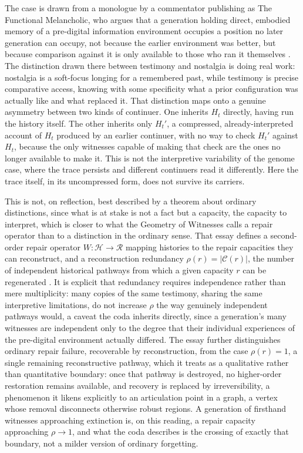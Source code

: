\documentclass[11pt]{article}
\begin{document}
The case is drawn from a monologue by a commentator publishing as The Functional Melancholic, who argues that a generation holding direct, embodied memory of a pre-digital information environment occupies a position no later generation can occupy, not because the earlier environment was better, but because comparison against it is only available to those who ran it themselves \cite{functionalmelancholic}. The distinction drawn there between testimony and nostalgia is doing real work: nostalgia is a soft-focus longing for a remembered past, while testimony is precise comparative access, knowing with some specificity what a prior configuration was actually like and what replaced it. That distinction maps onto a genuine asymmetry between two kinds of continuer. One inherits $H_t$ directly, having run the history itself. The other inherits only $H_t'$, a compressed, already-interpreted account of $H_t$ produced by an earlier continuer, with no way to check $H_t'$ against $H_t$, because the only witnesses capable of making that check are the ones no longer available to make it. This is not the interpretive variability of the genome case, where the trace persists and different continuers read it differently. Here the trace itself, in its uncompressed form, does not survive its carriers.

This is not, on reflection, best described by a theorem about ordinary distinctions, since what is at stake is not a fact but a capacity, the capacity to interpret, which is closer to what the Geometry of Witnesses calls a repair operator than to a distinction in the ordinary sense. That essay defines a second-order repair operator $W: \mathcal{H} \to \mathcal{R}$ mapping histories to the repair capacities they can reconstruct, and a reconstruction redundancy $\rho(r) = |\mathcal{C}(r)|$, the number of independent historical pathways from which a given capacity $r$ can be regenerated \cite{geometryofwitnesses}. It is explicit that redundancy requires independence rather than mere multiplicity: many copies of the same testimony, sharing the same interpretive limitations, do not increase $\rho$ the way genuinely independent pathways would, a caveat the coda inherits directly, since a generation's many witnesses are independent only to the degree that their individual experiences of the pre-digital environment actually differed. The essay further distinguishes ordinary repair failure, recoverable by reconstruction, from the case $\rho(r) = 1$, a single remaining reconstructive pathway, which it treats as a qualitative rather than quantitative boundary: once that pathway is destroyed, no higher-order restoration remains available, and recovery is replaced by irreversibility, a phenomenon it likens explicitly to an articulation point in a graph, a vertex whose removal disconnects otherwise robust regions. A generation of firsthand witnesses approaching extinction is, on this reading, a repair capacity approaching $\rho \to 1$, and what the coda describes is the crossing of exactly that boundary, not a milder version of ordinary forgetting.
\end{document}

